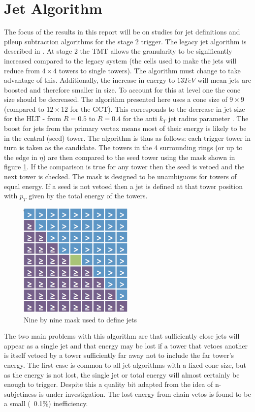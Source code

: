 \section{Jet Algorithm}
\label{algo}
The focus of the results in this report will be on studies for jet definitions and pileup subtraction algorithms for the stage 2 trigger. The legacy jet algorithm is described in \cite{gctalgo}. At stage 2 the TMT allows the granularity to be significantly increased compared to the legacy system (the cells used to make the jets will reduce from $4\times4$ towers to single towers). The algorithm must change to take advantage of this. Additionally, the increase in energy to $13TeV$ will mean jets are  boosted and therefore smaller in size. To account for this at level one the cone size should be decreased. The algorithm presented here uses a cone size of $9\times9$ (compared to $12\times12$ for the GCT). This corresponds to the decrease in jet size for the HLT - from $R=0.5$ to $R=0.4$ for the anti $k_T$ jet radius parameter \cite{Antik_t}. The boost for jets from the primary vertex means most of their energy is likely to be in the central (seed) tower. The algorithm is thus as follows: each trigger tower in turn is taken as the candidate. The towers in the 4 surrounding rings (or up to the edge in $\eta$) are then compared to the seed tower using the mask shown in figure \ref{mask}. If the comparison is true for any tower then the seed is vetoed and the next tower is checked. The mask is designed to be unambiguous for towers of equal energy. If a seed is not vetoed then a jet is defined at that tower position with $p_T$ given by the total energy of the towers.   
\begin{figure}
\centering
    \includegraphics[width=0.5\textwidth]{Figures/mask.png}
  \caption{Nine by nine mask used to define jets}
  \label{mask}
\end{figure}
The two main problems with this algorithm are that sufficiently close jets will appear as a single jet and that energy may be lost if a tower that vetoes another is itself vetoed by a tower sufficiently far away not to include the far tower's energy. The first case is common to all jet algorithms with a fixed cone size, but as the energy is not lost, the single jet or total energy will almost certainly be enough to trigger. Despite this a quality bit adapted from the idea of n-subjetiness \cite{nsub} is under investigation. The lost energy from chain vetos is found to be a small (~0.1\%) inefficiency.

